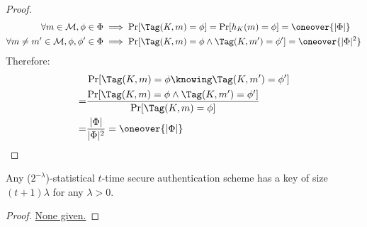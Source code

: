 \begin{proof}
    \begin{align*}
        \forall m \in \M, \phi \in \Phi &\implies \Pr[\Tag(K, m) = \phi] = \Pr[h_K(m) = \phi] = \oneover{|\Phi|} \\
        \forall m \neq m' \in \M, \phi, \phi' \in \Phi &\implies \Pr[\Tag(K, m) = \phi \wedge \Tag(K, m') = \phi'] = \oneover{|\Phi|^2} \\
    \end{align*}
    Therefore:
    \begin{align*}
        & \Pr[\Tag(K, m) = \phi \knowing \Tag(K, m') = \phi'] \\
        =& \frac{\Pr[\Tag(K, m) = \phi \wedge \Tag(K, m') = \phi']}{\Pr[\Tag(K, m) = \phi]} \\
        =& \frac{|\Phi|}{|\Phi|^2} = \oneover{|\Phi|}
    \end{align*}
\end{proof}

\begin{theorem}
    Any ($2^{-\lambda}$)-statistical $t$-time secure authentication scheme has a key of size $(t + 1) \lambda$ for any $\lambda > 0$.
\end{theorem}

\begin{proof}
    \underline{None given.}

\end{proof}
